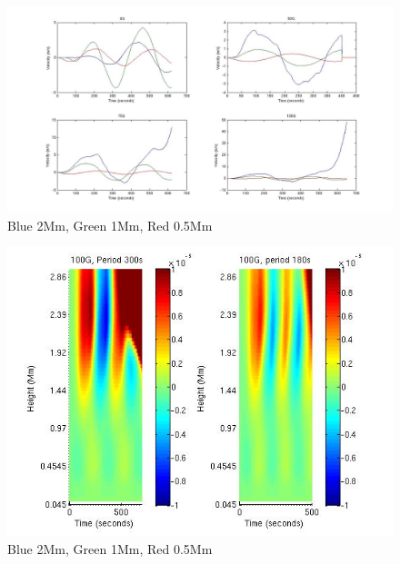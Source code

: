 \documentclass{aastex62}
\begin{document}
\begin{figure}[h]\label{dt_vvert_5b2_2_2Mm_1Mm_0p5MM_0G_25G_50G_100G_line}
\includegraphics[scale=0.45]{imrescale/dt_vvert_5b2_2_2Mm_1Mm_0p5MM_0G_25G_50G_100G_line.jpg}
\caption{Blue 2Mm, Green 1Mm, Red 0.5Mm}
\end{figure}






\begin{figure}[h]\label{dt_vvert_100G_300s_180s}
\includegraphics[scale=0.65]{imrescale/dt_vvert_100G_300s_180s.jpg}
\caption{Blue 2Mm, Green 1Mm, Red 0.5Mm}
\end{figure}
\end{document}
